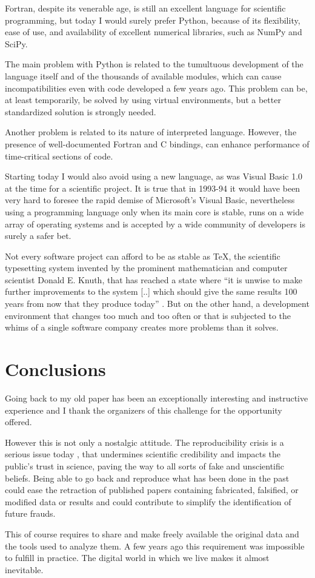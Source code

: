 Fortran, despite its venerable age, is still an excellent language for scientific programming, but today I would surely prefer Python, because of its flexibility, ease of use, and  availability of excellent numerical libraries, such as NumPy and SciPy.

The main problem with Python is related to the tumultuous development of the language itself and of the thousands of available modules, which can cause incompatibilities even with code developed a few years ago. This problem can be, at least temporarily, be solved by using virtual environments, but a better standardized solution is strongly needed.

Another problem is related to its nature of interpreted language. However, the presence of well-documented Fortran and C bindings, can enhance performance of time-critical sections of code.

Starting today I would also avoid using a new language, as was Visual Basic 1.0 at the time for a scientific project. 
It is true that in 1993-94 it would have been very hard to foresee the rapid demise of Microsoft's Visual Basic, nevertheless using a programming language only when its main core is stable, runs on a wide array of operating systems and is accepted by a wide community of developers is surely a safer bet.

Not every software project can afford to be as stable as \TeX, the scientific typesetting system invented by the prominent mathematician and computer scientist Donald E. Knuth, that has reached a state where ``it is unwise to make further improvements to the system [..] which should give the same results 100 years from now that they produce today'' \cite{Knuth:1990}.
But on the other hand, a development environment that changes too much and too often or that is subjected to the whims of a single software company creates more problems than it solves. 



\section{Conclusions}

Going back to my old paper has been an exceptionally interesting and instructive experience and I thank the organizers of this challenge for the opportunity offered.

However this is not only a nostalgic attitude. The reproducibility crisis is a serious issue today \cite{Miyakawa:2020}, that undermines scientific credibility and impacts the public's trust in science, paving the way to all sorts of fake and unscientific beliefs.
Being able to go back and reproduce what has been done in the past could ease the retraction of published papers containing fabricated, falsified, or modified data or results and could contribute to simplify the identification of future frauds.

This of course requires to share and make freely available the original data and the tools used to analyze them. A few years ago this requirement was impossible to fulfill in practice. The digital world in which we live makes it almost inevitable.
